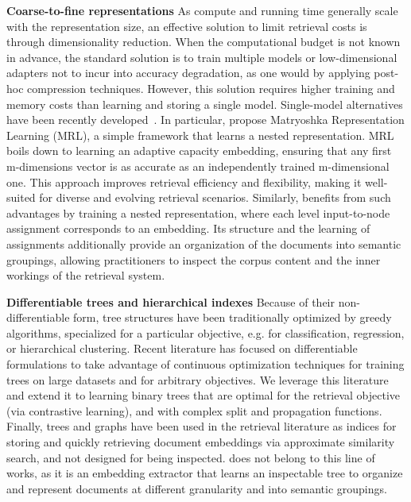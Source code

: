 \noindent\textbf{Coarse-to-fine representations}
As compute and running time generally scale with the representation size, an effective solution to limit retrieval costs is through dimensionality reduction\citep{van2009dimensionality}.
When the computational budget is not known in advance, the standard solution is to train multiple models or low-dimensional adapters not to incur into accuracy degradation, as one would by applying post-hoc compression techniques. However, this solution requires higher training and memory costs than learning and storing a single model.
Single-model alternatives have been recently developed~\citep{yu2018slimmable,cai2019once,kusupati2022matryoshka}.
In particular, \citep{kusupati2022matryoshka} propose Matryoshka Representation Learning (MRL), a simple framework that learns a nested representation. 
MRL boils down to learning an adaptive capacity embedding, ensuring that any first m-dimensions vector is as accurate as an independently trained m-dimensional one.  
This approach improves retrieval efficiency and flexibility, making it well-suited for diverse and evolving retrieval scenarios.
Similarly, \ourmodel{} benefits from such advantages by training a nested representation, where each level input-to-node assignment corresponds to an embedding. 
Its structure and the learning of assignments additionally provide an organization of the documents into semantic groupings, allowing practitioners to inspect the corpus content and the inner workings of the retrieval system.

\noindent\textbf{Differentiable trees and hierarchical indexes}
Because of their non-differentiable form, tree structures have been traditionally optimized by greedy algorithms, specialized for a particular objective, e.g. for classification, regression, or hierarchical clustering\citep{quinlan1986induction,krishnamurthy2012efficient,quinlan2014c4,breiman2017classification,moseley2023approximation}.
Recent literature has focused on differentiable formulations to take advantage of continuous optimization techniques for training trees on large datasets and for arbitrary objectives\citep{irsoy2012soft,yang2018deep,monath2019gradient,tanno2019adaptive,pmlr-v139-zantedeschi21a,marton2024gradtree}.
We leverage this literature and extend it to learning binary trees that are optimal for the retrieval objective (via contrastive learning), and with complex split and propagation functions.
Finally, trees and graphs have been used in the retrieval literature as indices for storing and quickly retrieving document embeddings via approximate similarity search, and not designed for being inspected\citep{bernhardsson2017annoy,malkov2018efficient,douze2024faiss}.
\ourmodel{} does not belong to this line of works, as it is an embedding extractor that learns an inspectable tree to organize and represent documents at different granularity and into semantic groupings.